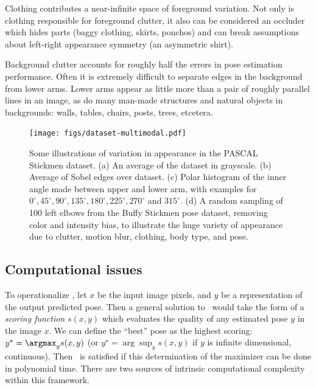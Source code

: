  Clothing contributes a near-infinite space of foreground 
variation.  Not only is clothing responsible for foreground clutter, it also 
can be considered an occluder which hides parts (\eg baggy clothing, skirts, 
ponchos) and can break assumptions about left-right appearance symmetry (\eg an 
asymmetric shirt).

 Background clutter accounts for roughly half the 
errors in pose estimation performance. Often it is extremely difficult to 
separate edges in the background from lower arms.  Lower arms appear as little 
more than a pair of roughly parallel lines in an image, as do many man-made 
structures and natural objects in backgrounds: walls, tables, chairs, posts, 
trees, etcetera.

\begin{figure}[tb]
\begin{center}
\texttt{[image: figs/dataset-multimodal.pdf]}
\caption[Variations in appearance]{Some illustrations of variation in 
appearance in the PASCAL Stickmen dataset.  (a) An average of the dataset in 
grayscale.  (b) Average of Sobel edges over dataset.  (c) Polar histogram of 
the inner angle made between upper and lower arm, with examples for 
$0^\circ,45^\circ,90^\circ,135^\circ,180^\circ,225^\circ,270^\circ$ and 
$315^\circ$. (d) A random sampling of 100 left elbows from the Buffy Stickmen 
pose dataset,	removing color and intensity bias, to illustrate the huge variety 
of appearance due to	clutter, motion blur, clothing, body type, and pose.  
\label{fig:dataset-multimodal}}
\end{center}
\end{figure}



\subsection{Computational issues}

To operationalize , let $x$ be the input image pixels, and $y$ be 
a representation of the output predicted pose.  Then a general solution 
to~ would take the form of a {\em scoring function} $s(x,y)$ 
which evaluates the quality of any estimated pose $y$ in the image $x$.  We can 
define the ``best'' pose as the highest scoring: $y^\star = \argmax_y s(x,y)$ 
(or $y^\star = \arg\sup_y s(x,y)$ if $y$ is infinite dimensional, \ie 
continuous).  Then~ is satisfied if this determination of the 
maximizer can be done in polynomial time. There are two sources of intrinsic 
computational complexity within this framework. 


